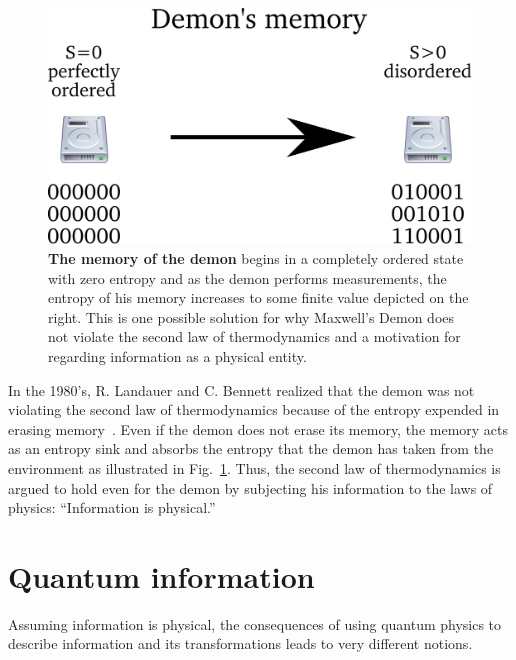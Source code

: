 \documentclass[11pt,oneside,final]{huthesis}%
\begin{document}
\begin{figure}
\begin{center}
\includegraphics[width=.75\columnwidth]{./figures/demonres}
\end{center}
\caption{\textbf{The memory of the demon} begins in a completely ordered state with zero entropy and as the demon performs measurements, the entropy of his memory increases to some finite value depicted on the right.  This is one possible solution for why Maxwell's Demon does not violate the second law of thermodynamics and a motivation for regarding information as a physical entity.
}
\label{fig:demon}
\end{figure}
In the 1980's, R. Landauer and C. Bennett realized that the demon was not violating the second law of thermodynamics because of the entropy expended in erasing memory~\cite{Bennett03}.  Even if the demon does not erase its memory, the memory acts as an entropy sink and absorbs the entropy that the demon has taken from the environment as illustrated in Fig.~\ref{fig:demon}.  Thus, the second law of thermodynamics is argued to hold even for the demon by subjecting his information to the laws of physics: ``Information is physical.''


\section{Quantum information}\label{sec:qinfo}
Assuming information is physical, the consequences of using quantum physics to describe information and its transformations leads to very different notions.
\end{document}
